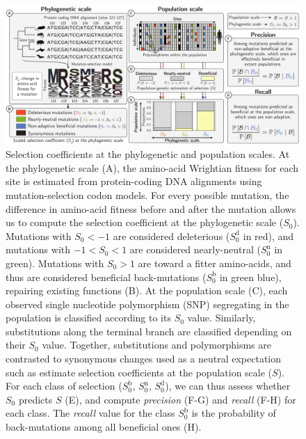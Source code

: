 \documentclass{article}
\newcommand{\Sphy}{S_{0}}
\newcommand{\Spop}{S}
\begin{document}
    \begin{figure}[!ht]
        \centering
        \includegraphics[width=\textwidth, page=1] {artworks/figure.method.proba}
        \caption{
            Selection coefficients at the phylogenetic and population scales.
            At the phylogenetic scale (A), the amino-acid Wrightian fitness for each site is estimated from protein-coding DNA alignments using mutation-selection codon models.
            For every possible mutation, the difference in amino-acid fitness before and after the mutation allows us to compute the selection coefficient at the phylogenetic scale ($\Sphy$).
            Mutations with $\Sphy < -1$ are considered deleterious ($\Sphy^{\text{d}}$ in red), and mutations with $-1 < \Sphy < 1$ are considered nearly-neutral ($\Sphy^{\text{n}}$ in green).
            Mutations with $\Sphy > 1$ are toward a fitter amino-acids, and thus are considered beneficial back-mutations ($\Sphy^{\text{b}}$ in green blue), repairing existing functions (B).
            At the population scale (C), each observed single nucleotide polymorphism (SNP) segregating in the population is classified according to its $\Sphy$ value.
            Similarly, substitutions along the terminal branch are classified depending on their $\Sphy$ value.
            Together, substitutions and polymorphisms are contrasted to synonymous changes used as a neutral expectation such as estimate selection coefficients at the population scale ($\Spop$).
            For each class of selection ($\Sphy^{\text{b}}$, $\Sphy^{\text{n}}$, $\Sphy^{\text{d}}$), we can thus assess whether $\Sphy$ predicts $\Spop$ (E), and compute \textit{precision} (F-G) and \textit{recall} (F-H) for each class.
            The \textit{recall} value for the class $\Sphy^{\text{b}}$ is the probability of back-mutations among all beneficial ones (H).
        }
        \label{fig:method}
    \end{figure}
\end{document}
